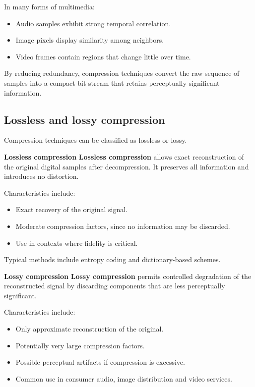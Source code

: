 In many forms of multimedia:

\begin{itemize}
\item Audio samples exhibit strong temporal correlation.
\item Image pixels display similarity among neighbors.
\item Video frames contain regions that change little over time.
\end{itemize}

By reducing redundancy, compression techniques convert the raw sequence of samples into a compact bit stream that retains perceptually significant information.

\subsection{Lossless and lossy compression}

Compression techniques can be classified as lossless or lossy.

\textbf{Lossless compression} \textbf{Lossless compression} allows exact reconstruction of the original digital samples after decompression. It preserves all information and introduces no distortion.

Characteristics include:

\begin{itemize}
\item Exact recovery of the original signal.
\item Moderate compression factors, since no information may be discarded.
\item Use in contexts where fidelity is critical.
\end{itemize}

Typical methods include entropy coding and dictionary-based schemes.

\textbf{Lossy compression} \textbf{Lossy compression} permits controlled degradation of the reconstructed signal by discarding components that are less perceptually significant.

Characteristics include:

\begin{itemize}
\item Only approximate reconstruction of the original.
\item Potentially very large compression factors.
\item Possible perceptual artifacts if compression is excessive.
\item Common use in consumer audio, image distribution and video services.
\end{itemize}

